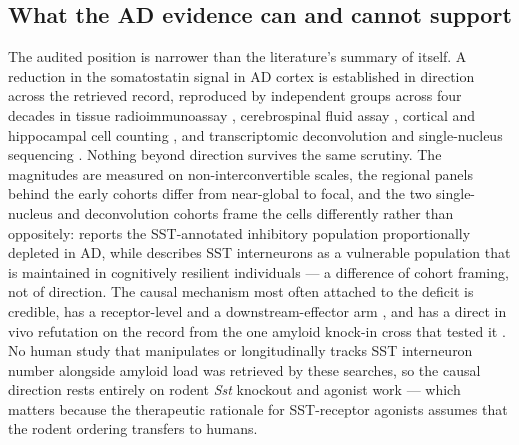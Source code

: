 \documentclass[11pt]{article}
\begin{document}
\subsection{What the AD evidence can and cannot support}
\label{sec-04-what-the-evidence-supports}

The audited position is narrower than the literature's summary of itself. A reduction in the somatostatin signal in AD cortex is established in direction across the retrieved record, reproduced by independent groups across four decades in tissue radioimmunoassay \citep{Davies1981,Rossor1980,Arai1984,Mazurek1991}, cerebrospinal fluid assay \citep{Soininen1984,Atack1988,Urakami1989}, cortical and hippocampal cell counting \citep{Gaspar1989,GonzalezRodriguez2021}, and transcriptomic deconvolution and single-nucleus sequencing \citep{Consens2022a,Consens2022b,Castanho2025b}. Nothing beyond direction survives the same scrutiny. The magnitudes are measured on non-interconvertible scales, the regional panels behind the early cohorts differ from near-global to focal, and the two single-nucleus and deconvolution cohorts frame the cells differently rather than oppositely: \citet{Consens2022b} reports the SST-annotated inhibitory population proportionally depleted in AD, while \citet{Castanho2025b} describes SST interneurons as a vulnerable population that is maintained in cognitively resilient individuals --- a difference of cohort framing, not of direction. The causal mechanism most often attached to the deficit is credible, has a receptor-level and a downstream-effector arm \citep{Nilsson2020,Nilsson2025,Watamura2021,Watamura2020}, and has a direct in vivo refutation on the record from the one amyloid knock-in cross that tested it \citep{Williams2023,Williams2022}. No human study that manipulates or longitudinally tracks SST interneuron number alongside amyloid load was retrieved by these searches, so the causal direction rests entirely on rodent \emph{Sst} knockout and agonist work --- which matters because the therapeutic rationale for SST-receptor agonists assumes that the rodent ordering transfers to humans.
\end{document}
